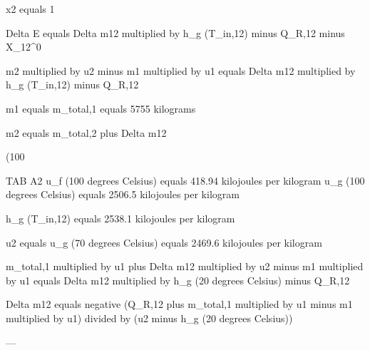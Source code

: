 x2 equals 1  

Delta E equals Delta m12 multiplied by h_g (T_in,12) minus Q_R,12 minus X_12^0  

m2 multiplied by u2 minus m1 multiplied by u1 equals Delta m12 multiplied by h_g (T_in,12) minus Q_R,12  

m1 equals m_total,1 equals 5755 kilograms  

m2 equals m_total,2 plus Delta m12  

(100%

TAB A2  
u_f (100 degrees Celsius) equals 418.94 kilojoules per kilogram  
u_g (100 degrees Celsius) equals 2506.5 kilojoules per kilogram  

h_g (T_in,12) equals 2538.1 kilojoules per kilogram  

u2 equals u_g (70 degrees Celsius) equals 2469.6 kilojoules per kilogram  

m_total,1 multiplied by u1 plus Delta m12 multiplied by u2 minus m1 multiplied by u1 equals Delta m12 multiplied by h_g (20 degrees Celsius) minus Q_R,12  

Delta m12 equals negative (Q_R,12 plus m_total,1 multiplied by u1 minus m1 multiplied by u1) divided by (u2 minus h_g (20 degrees Celsius))  

---